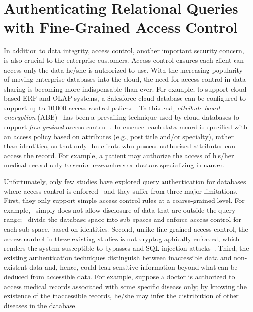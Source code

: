 \section{Authenticating Relational Queries with Fine-Grained Access Control}

In addition to data integrity, access control, another important security concern, is also crucial to the enterprise customers. Access control ensures each client can access only the data he/she is authorized to use. With the increasing popularity of moving enterprise databases into the cloud, the need for access control in data sharing is becoming more indispensable than ever. For example, to support cloud-based ERP and OLAP systems, a Salesforce cloud database can be configured to support up to 10,000 access control polices~\cite{salesforce}. To this end, \emph{attribute-based encryption} (ABE)~\cite{10.1145/1180405.1180418,10.1109/sp.2007.11} has been a prevailing technique used by cloud databases to support \emph{fine-grained} access control~\cite{10.1145/2699026.2699101,10.1007/978-3-662-43936-4_21,10.1007/s10916-016-0588-0}. In essence, each data record is specified with an access policy based on attributes (e.g., post title and/or specialty), rather than identities, so that only the clients who possess authorized attributes can access the record. For example, a patient may authorize the access of his/her medical record only to senior researchers or doctors specializing in cancer.

Unfortunately, only few studies have explored query authentication for databases where access control is enforced~\cite{10.1007/978-3-540-88313-5_12,10.1007/978-3-642-39256-6_14,10.1145/1066157.1066204} and they suffer from three major limitations. First, they only support simple access control rules at a coarse-grained level. For example,~\cite{10.1145/1066157.1066204} simply does not allow disclosure of data that are outside the query range;~\cite{10.1007/978-3-540-88313-5_12,10.1007/978-3-642-39256-6_14} divide the database space into sub-spaces and enforce access control for each sub-space, based on identities. Second, unlike fine-grained access control, the access control in these existing studies is not cryptographically enforced, which renders the system susceptible to bypasses and SQL injection attacks~\cite{10.1145/2699026.2699101}. Third, the existing authentication techniques distinguish between inaccessible data and non-existent data and, hence, could leak sensitive information  beyond what can be deduced from accessible data. For example, suppose a doctor is authorized to access medical records associated with some specific disease only; by knowing the existence of the inaccessible records, he/she may infer the  distribution of other diseases in the database.


